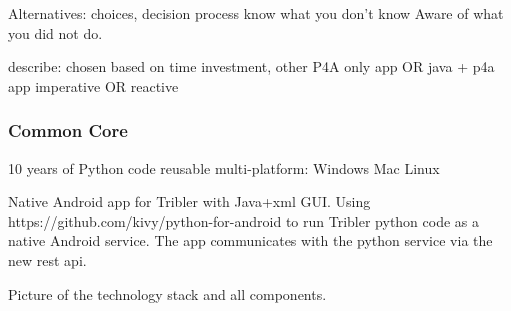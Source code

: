 Alternatives: choices, decision process
know what you don't know
Aware of what you did not do.


describe: chosen based on time investment, other 
P4A only app OR java + p4a app
imperative OR reactive



\subsubsection{Common Core}
10 years of Python code 
reusable multi-platform: Windows Mac Linux


Native Android app for Tribler with Java+xml GUI.
Using https://github.com/kivy/python-for-android to run Tribler python code as a native Android service.
The app communicates with the python service via the new rest api.

Picture of the technology stack and all components.
